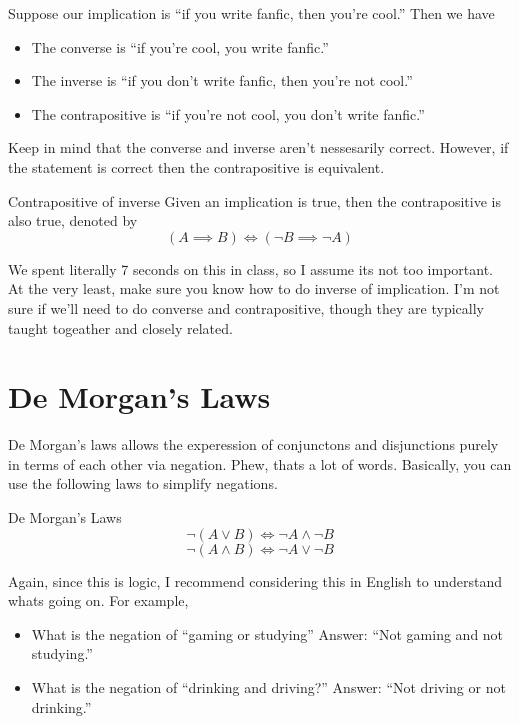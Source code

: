 \begin{boxexample}{}{}
	Suppose our implication is ``if you write fanfic, then you're cool.'' Then we have
	
	\begin{itemize}
		\item The converse is ``if you're cool, you write fanfic.''
		\item The inverse is ``if you don't write fanfic, then you're not cool.''
		\item The contrapositive is ``if you're not cool, you don't write fanfic.''
	\end{itemize}
\end{boxexample}

Keep in mind that the converse and inverse aren't nessesarily correct. However, if the statement is correct then the contrapositive is equivalent.

\begin{boxproposition}{Contrapositive of inverse}{}
	Given an implication is true, then the contrapositive is also true, denoted by
	\[
		(A \implies B) \iff (\lnot B \implies \lnot A)
	\]
\end{boxproposition}

We spent literally 7 seconds on this in class, so I assume its not too important. At the very least, make sure you know how to do inverse of implication. I'm not sure if we'll need to do converse and contrapositive, though they are typically taught togeather and closely related.

\section{De Morgan's Laws}

De Morgan's laws allows the experession of conjunctons and disjunctions purely in terms of each other via negation. Phew, thats a lot of words. Basically, you can use the following laws to simplify negations.

\begin{boxproposition}{De Morgan's Laws}{}
	\[
		\lnot (A \lor B) \iff \lnot A \land \lnot B
	\]
	\[
		\lnot (A \land B) \iff \lnot A \lor \lnot B
	\]
\end{boxproposition}

Again, since this is logic, I recommend considering this in English to understand whats going on. For example,

\begin{boxexample}{}{}
	\begin{itemize}
		\item What is the negation of ``gaming or studying'' Answer: ``Not gaming and not studying.''
		\item What is the negation of ``drinking and driving?'' Answer: ``Not driving or not drinking.''
	\end{itemize}
\end{boxexample}

